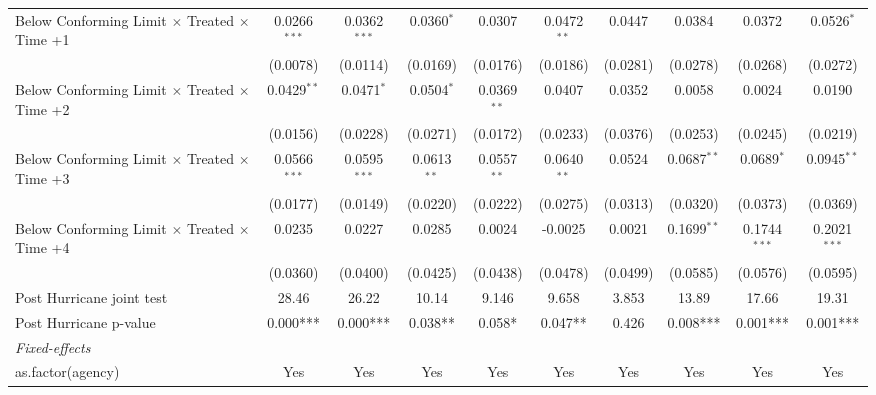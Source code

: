 \begin{tabular}{lccccccccc}
   Below Conforming Limit $\times$ Treated $\times$ Time +1   & 0.0266$^{***}$ & 0.0362$^{***}$ & 0.0360$^{*}$  & 0.0307        & 0.0472$^{**}$ & 0.0447       & 0.0384        & 0.0372         & 0.0526$^{*}$\\   
                                                              & (0.0078)       & (0.0114)       & (0.0169)      & (0.0176)      & (0.0186)      & (0.0281)     & (0.0278)      & (0.0268)       & (0.0272)\\   
   Below Conforming Limit $\times$ Treated $\times$ Time +2   & 0.0429$^{**}$  & 0.0471$^{*}$   & 0.0504$^{*}$  & 0.0369$^{**}$ & 0.0407        & 0.0352       & 0.0058        & 0.0024         & 0.0190\\   
                                                              & (0.0156)       & (0.0228)       & (0.0271)      & (0.0172)      & (0.0233)      & (0.0376)     & (0.0253)      & (0.0245)       & (0.0219)\\   
   Below Conforming Limit $\times$ Treated $\times$ Time +3   & 0.0566$^{***}$ & 0.0595$^{***}$ & 0.0613$^{**}$ & 0.0557$^{**}$ & 0.0640$^{**}$ & 0.0524       & 0.0687$^{**}$ & 0.0689$^{*}$   & 0.0945$^{**}$\\   
                                                              & (0.0177)       & (0.0149)       & (0.0220)      & (0.0222)      & (0.0275)      & (0.0313)     & (0.0320)      & (0.0373)       & (0.0369)\\   
   Below Conforming Limit $\times$ Treated $\times$ Time +4   & 0.0235         & 0.0227         & 0.0285        & 0.0024        & -0.0025       & 0.0021       & 0.1699$^{**}$ & 0.1744$^{***}$ & 0.2021$^{***}$\\   
                                                              & (0.0360)       & (0.0400)       & (0.0425)      & (0.0438)      & (0.0478)      & (0.0499)     & (0.0585)      & (0.0576)       & (0.0595)\\   
   Post Hurricane joint test                                  & 28.46          & 26.22          & 10.14         & 9.146         & 9.658         & 3.853        & 13.89         & 17.66          & 19.31\\  
   Post Hurricane p-value                                     & 0.000***       & 0.000***       & 0.038**       & 0.058*        & 0.047**       & 0.426        & 0.008***      & 0.001***       & 0.001***\\  
   \midrule
   \emph{Fixed-effects}\\
   as.factor(agency)                                          & Yes            & Yes            & Yes           & Yes           & Yes           & Yes          & Yes           & Yes            & Yes\\  

\end{tabular}

